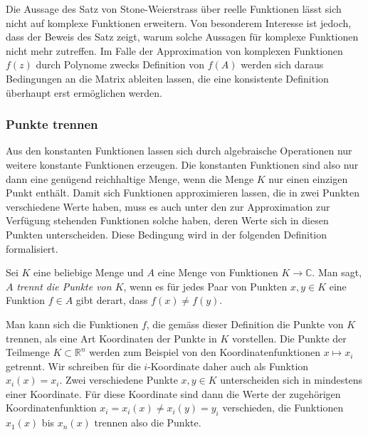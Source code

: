 Die Aussage des Satz von Stone-Weierstrass über reelle Funktionen
lässt sich nicht auf komplexe Funktionen erweitern.
Von besonderem Interesse ist jedoch, dass der Beweis des Satz 
zeigt, warum solche Aussagen für komplexe Funktionen nicht mehr
zutreffen.
Im Falle der Approximation von komplexen Funktionen $f(z)$ durch Polynome
zwecks Definition von $f(A)$ werden sich daraus Bedingungen an die
Matrix ableiten lassen, die eine konsistente Definition überhaupt
erst ermöglichen werden.

\subsubsection{Punkte trennen}
Aus den konstanten Funktionen lassen sich durch algebraische
Operationen nur weitere konstante Funktionen erzeugen.
Die konstanten Funktionen sind also nur dann eine genügend
reichhaltige Menge, wenn die Menge $K$ nur einen einzigen Punkt
enthält.
Damit sich Funktionen approximieren lassen, die in zwei Punkten
verschiedene Werte haben, muss es auch unter den zur Approximation
zur Verfügung stehenden Funktionen solche haben, deren Werte sich
in diesen Punkten unterscheiden.
Diese Bedingung wird in der folgenden Definition formalisiert.

\begin{definition}
Sei $K$ eine beliebige Menge und $A$ eine Menge von Funktionen
$K\to \mathbb{C}$.
Man sagt, $A$ {\em trennt die Punkte von $K$}, wenn es für jedes Paar
%
von Punkten $x,y\in K$ eine Funktion $f\in A$ gibt derart, dass
$f(x)\ne f(y)$.
\end{definition}

Man kann sich die Funktionen $f$, die gemäss dieser Definition die Punkte
von $K$ trennen, als eine Art Koordinaten der Punkte in $K$ vorstellen.
Die Punkte der Teilmenge $K\subset \mathbb{R}^n$ werden zum Beispiel
von den Koordinatenfunktionen $x\mapsto x_i$ getrennt.
Wir schreiben für die $i$-Koordinate daher auch als Funktion $x_i(x)=x_i$.
Zwei verschiedene Punkte $x,y\in K$ unterscheiden sich in mindestens
einer Koordinate.
Für diese Koordinate sind dann die Werte der zugehörigen
Koordinatenfunktion $x_i=x_i(x)\ne x_i(y)=y_i$ verschieden, die
Funktionen $x_1(x)$ bis $x_n(x)$ trennen also die Punkte.

